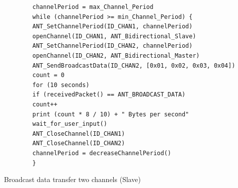 \begin{description}
	\begin{code}[h]
		\begin{verbatim}
		channelPeriod = max_Channel_Period
		while (channelPeriod >= min_Channel_Period) {
		ANT_SetChannelPeriod(ID_CHAN1, channelPeriod)
		openChannel(ID_CHAN1, ANT_Bidirectional_Slave)
		ANT_SetChannelPeriod(ID_CHAN2, channelPeriod)
		openChannel(ID_CHAN2, ANT_Bidirectional_Master)
		ANT_SendBroadcastData(ID_CHAN2, [0x01, 0x02, 0x03, 0x04])
		count = 0
		for (10 seconds) 
		if (receivedPacket() == ANT_BROADCAST_DATA)
		count++			
		print (count * 8 / 10) + " Bytes per second"
		wait_for_user_input()
		ANT_CloseChannel(ID_CHAN1)
		ANT_CloseChannel(ID_CHAN2)
		channelPeriod = decreaseChannelPeriod()
		}
		\end{verbatim}
		\caption{Broadcast data transfer two channels (Slave)}\label{lst:mExp2}
	\end{code}
	

\end{description}
